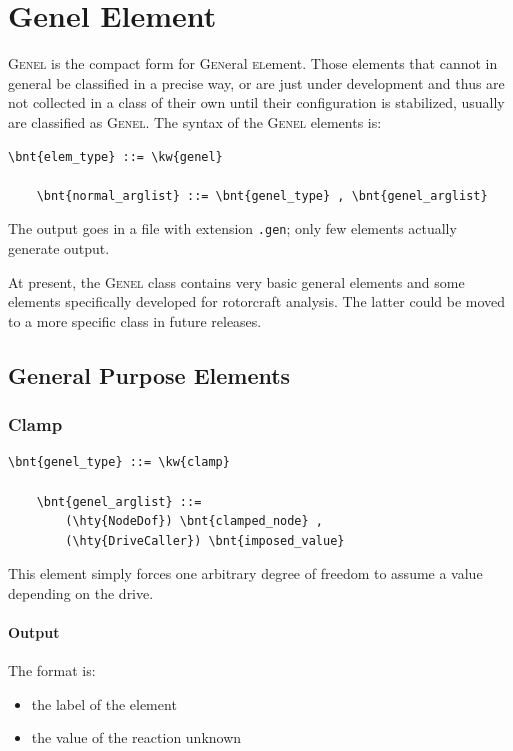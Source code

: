 \section{Genel Element}
\label{sec:EL:GENEL}
\textsc{Genel} is the compact form for \textsc{Gen}eral \textsc{el}ement.
Those elements that cannot in general be classified in a precise way, 
or are just under development and thus are not collected in a class 
of their own until their configuration is stabilized, usually are
classified as \textsc{Genel}.
The syntax of the \textsc{Genel} elements is:
\begin{Verbatim}[commandchars=\\\{\}]
    \bnt{elem_type} ::= \kw{genel}

    \bnt{normal_arglist} ::= \bnt{genel_type} , \bnt{genel_arglist}
\end{Verbatim}

\noindent
The output goes in a file with extension \texttt{.gen}; only few elements
actually generate output.

\noindent
At present, the \textsc{Genel} class contains very basic general elements
and some elements specifically developed for rotorcraft analysis.
The latter could be moved to a more specific class in future releases.

\subsection{General Purpose Elements}
   
\subsubsection{Clamp}
\label{sec:EL:GENEL:CLAMP}
\begin{Verbatim}[commandchars=\\\{\}]
    \bnt{genel_type} ::= \kw{clamp}

    \bnt{genel_arglist} ::=
        (\hty{NodeDof}) \bnt{clamped_node} ,
        (\hty{DriveCaller}) \bnt{imposed_value}
\end{Verbatim}
This element simply forces one arbitrary degree of freedom to assume a value
depending on the drive.

\paragraph{Output}
The format is:
\begin{itemize}
    \item the label of the element
    \item the value of the reaction unknown
\end{itemize}
  
